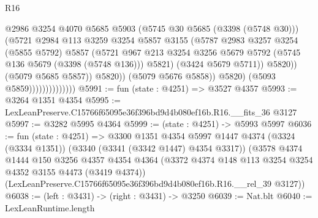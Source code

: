 \begin{lexlean}{R16}
\begin{coremodule}
                                          @2986
                                          @3254
                                          @4070
                                          @5685
                                          @5903
                                          (@5745 @30 @5685 (@3398 (@5748 @30)))
                                          (@5721
                                            @2984
                                            @113
                                            @3259
                                            @3254
                                            @5857
                                            @3155
                                            (@5787
                                              @2983
                                              @3257
                                              @3254
                                              (@5855 @5792)
                                              @5857
                                              (@5721
                                                @967
                                                @213
                                                @3254
                                                @3256
                                                @5679
                                                @5792
                                                (@5745 @136 @5679 (@3398 (@5748 @136)))
                                                @5821)
                                              (@3424 @5679 @5711))
                                            @5820))
                                        (@5079 @5685 @5857))
                                      @5820))
                                  (@5079 @5676 @5858))
                                @5820)
                              (@5093 @5859))))))))))))))
@5991 := fun (state : @4251) => @3527 @4357
@5993 := @3264 @1351 @4354
@5995 := LexLeanPreserve.C15766f65095e36f396bd9d4b080ef16b.R16.__fits_36 @3127
@5997 := @3282 @5995 @4364
@5999 := (state : @4251) -> @5993 @5997
@6036 := fun (state : @4251) =>
  @3300
    @1351
    @4354
    @5997
    @1447
    @4374
    (@3324 (@3334 @1351))
    (@3340 (@3341 (@3342 @1447) @4354 @3317))
    (@3578
      @4374
      @1444
      @150
      @3256
      @4357
      @4354
      @4364
      (@3372 @4374 @148 @113 @3254 @3254 @4352 @3155 @4473 (@3419 @4374))
      (LexLeanPreserve.C15766f65095e36f396bd9d4b080ef16b.R16.__rel_39 @3127))
@6038 := (left : @3431) -> (right : @3431) -> @3250
@6039 := Nat.blt
@6040 := LexLeanRuntime.length

\end{coremodule}
\end{lexlean}
